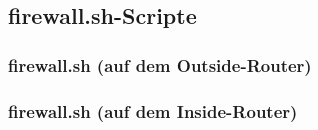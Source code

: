 \subsection{firewall.sh-Scripte}
\label{app:Firewall}

\subsubsection{firewall.sh (auf dem Outside-Router)}
\label{app:Firewall-Outside}


\subsubsection{firewall.sh (auf dem Inside-Router)}
\label{app:Firewall-Inside}

